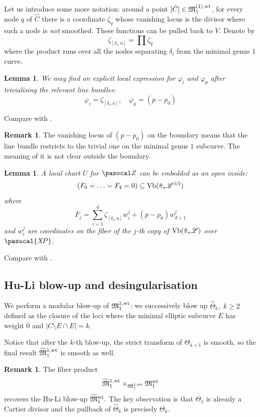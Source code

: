 \documentclass[11pt]{amsart}
\newcommand{\XP}{\pazocal{X\!P}}
\newcommand{\Z}{\pazocal Z}
\newcommand{\MM}{\mathfrak M}
\theoremstyle{plain}
\newtheorem{lem}[thm]{Lemma}
\theoremstyle{definition}
\newtheorem{remark}[thm]{Remark}
\begin{document}
Let us introduce some more notation: around a point $[\hat C]\in\MM_1^{(1),\rm{wt}}$, for every node $q$ of $\hat C$ there is a coordinate $\zeta_q$ whose vanishing locus is the divisor where such a node is \emph{not} smoothed. These functions can be pulled back to $V$. Denote by \[\zeta_{[\delta_i,a]}=\prod\zeta_q\]
where the product runs over all the nodes separating $\delta_i$ from the minimal genus $1$ curve.
 
\begin{lem}
We may find an explicit local expression for $\varphi_i$ and $\varphi_p$ after trivialising the relevant line bundles:
\[\varphi_i=\zeta_{[\delta_i,a]}, \quad \varphi_p=(p-p_0)\]
\end{lem}
Compare with \cite[Proposition 4.13]{HL}.
\begin{remark}
The vanishing locus of $(p-p_0)$ on the boundary means that the line bundle restricts to the trivial one on the minimal genus $1$ subcurve. The meaning of it is not clear outside the boundary.
\end{remark}

\begin{lem}\label{lem:equations}
A local chart $U$ for $\Z$ can be embedded as an open inside:
\[ (F_0=\ldots=F_4=0)\subseteq \rm{Vb}(\hat{\pi}_*\mathcal L^{\oplus 5}) \]
where
\[ F_j=\sum_{i=1}^d \zeta_{[\delta_i,a]}w_i^j+(p-p_0)w_{d+1}^j \]
and $w_i^j$ are coordinates on the fiber of the $j$-th copy of $\rm{Vb}(\hat{\pi}_*\mathcal L)$ over $\XP$.
\end{lem}
Compare with \cite[Theorems 2.17-19]{HL}.

\subsection{Hu-Li blow-up and desingularisation}
We perform a modular blow-up of $\MM_1^{1,\rm{wt}}$: we successively blow up $\hat\Theta_k, \;k\geq 2$  defined as the closure of the loci where the minimal elliptic subcurve $E$ has weight $0$ and $\lvert\overline{C\setminus E}\cap E\rvert=k.$

Notice that after the $k$-th blow-up, the strict transform of $\Theta_{k+1}$ is smooth, so the final result  $\widetilde{\MM}_1^{1,\rm{wt}}$ is smooth as well. 

\begin{remark}
The fiber product 
\[\widetilde{\MM}_1^{1,\rm{wt}}\times_{\MM_1^{1,\rm{wt}}}\MM_1^{\rm{wt}}\]
recovers the Hu-Li blow-up $\widetilde{\MM}_1^{\rm{wt}}.$ The key observation is that $\Theta_1$ is already a Cartier divisor and the pullback of $\hat\Theta_k$ is precisely $\Theta_k$.
\end{remark}
\end{document}
